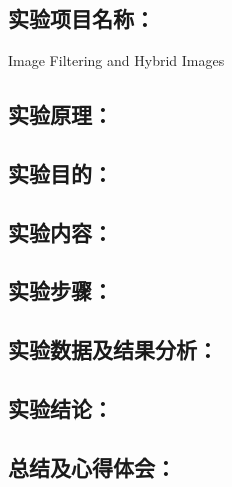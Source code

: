 \documentclass[a4paper,11pt,UTF8,AutoFakeBold]{ctexart}
\begin{document}
\xiaosihao {}  

\author{谢卿云}


\chapter{}{}{}           %

\section{实验项目名称：}
Image Filtering and Hybrid Images

\section{实验原理：}


\section{实验目的：}


\section{实验内容：}


\section{实验步骤：}


\section{实验数据及结果分析：}


\section{实验结论：}


\section{总结及心得体会：}

\end{document}
